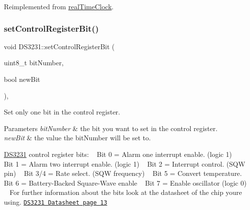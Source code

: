 Reimplemented from \mbox{\hyperlink{classreal_time_clock_ab4034ba75fb65a55fb725c37e89f7626}{real\+Time\+Clock}}.

\mbox{\label{class_d_s3231_a9ed1255adb58ecd03a541a4d481496c4}} 
\subsubsection{\texorpdfstring{set\+Control\+Register\+Bit()}{setControlRegisterBit()}}
{\footnotesize\ttfamily void D\+S3231\+::set\+Control\+Register\+Bit (\begin{DoxyParamCaption}\item[{uint8\+\_\+t}]{bit\+Number,  }\item[{bool}]{new\+Bit }\end{DoxyParamCaption})\hspace{0.3cm}{\ttfamily [override]}, {\ttfamily [virtual]}}



Set only one bit in the control register. 


\begin{DoxyParams}{Parameters}
{\em bit\+Number} & the bit you want to set in the control register. \\
\hline
{\em new\+Bit} & the value the bit\+Number will be set to.\\
\hline
\end{DoxyParams}
\mbox{\hyperlink{class_d_s3231}{D\+S3231}} control register bits\+: ~\newline
 Bit 0 = Alarm one interrupt enable. (logic 1) ~\newline
 Bit 1 = Alarm two interrupt enable. (logic 1) ~\newline
 Bit 2 = Interrupt control. (S\+QW pin) ~\newline
 Bit 3/4 = Rate select. (S\+QW frequency) ~\newline
 Bit 5 = Convert temperature. ~\newline
 Bit 6 = Battery-\/\+Backed Square-\/\+Wave enable ~\newline
 Bit 7 = Enable oscillator (logic 0) ~\newline
 For further information about the bits look at the datasheet of the chip you\textquotesingle{}re using. \href{https://datasheets.maximintegrated.com/en/ds/DS3231.pdf}{\tt D\+S3231 Datasheet page 13} 

